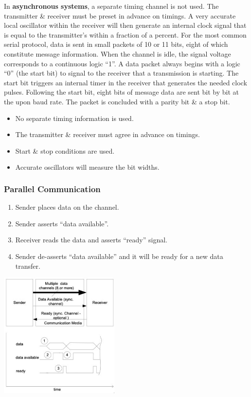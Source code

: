 \documentclass[11pt]{article}
\begin{document}
In \textbf{asynchronous systems}, a separate timing channel is not used. 
The transmitter \& receiver must be preset in advance on timings. 
A very accurate local oscillator within the receiver will then generate an internal clock signal that is equal to the transmitter's 
within a fraction of a percent. 
For the most common serial protocol, data is sent in small packets of 10 or 11 bits, eight of which constitute message information. 
When the channel is idle, the signal voltage corresponds to a continuous logic ``1''. 
A data packet always begins with a logic ``0'' (the start bit) to signal to the receiver that a transmission is starting. 
The start bit triggers an internal timer in the receiver that generates the needed clock pulses. 
Following the start bit, eight bits of message data are sent bit by bit at the upon baud rate. 
The packet is concluded with a parity bit \& a stop bit. 
\begin{itemize}
    \item No separate timing information is used. 
    \item The transmitter \& receiver must agree in advance on timings. 
    \item Start \& stop conditions are used. 
    \item Accurate oscillators will measure the bit widths. 
\end{itemize}

\subsubsection{Parallel Communication}
\begin{enumerate}
    \item   Sender places data on the channel. 
    \item   Sender asserts ``data available''. 
    \item   Receiver reads the data and asserts ``ready'' signal. 
    \item   Sender de-asserts ``data available'' and it will be ready for a new data transfer. 
\end{enumerate}

\begin{center}
    \includegraphics[width=0.45\textwidth]{parallelcomm.png}
\end{center}
\end{document}

